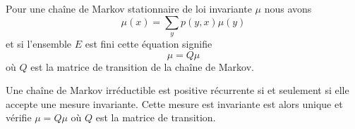 \begin{remark}\label{RemcOEylF}
    Pour une chaîne de Markov stationnaire de loi invariante $\mu$ nous avons
    \begin{equation}
        \mu(x)=\sum_yp(y,x)\mu(y)
    \end{equation}
    et si l'ensemble \( E\) est fini cette équation signifie
    \begin{equation}
        \mu=Q\mu
    \end{equation}
    où \( Q\) est la matrice de transition de la chaîne de Markov.
\end{remark}


\begin{theorem}
    Une chaîne de Markov irréductible est positive récurrente si et seulement si elle accepte une mesure invariante. Cette mesure est invariante est alors unique et vérifie \( \mu=Q\mu\) où \( Q\) est la matrice de transition.
\end{theorem}

